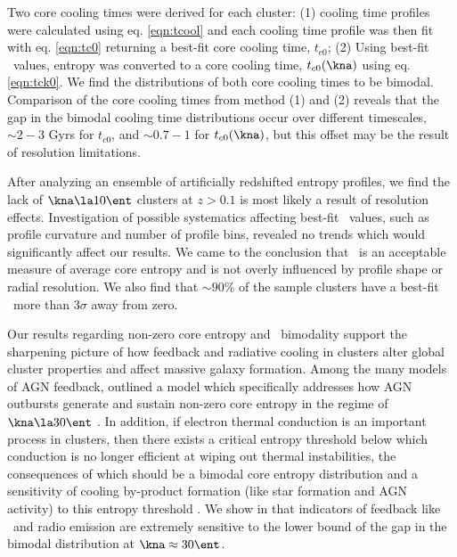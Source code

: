 Two core cooling times were derived for each cluster: (1) cooling time
profiles were calculated using eq. \ref{eqn:tcool} and each cooling
time profile was then fit with eq. \ref{eqn:tc0} returning a best-fit
core cooling time, $t_{c0}$; (2) Using best-fit \kna\ values, entropy
was converted to a core cooling time, $t_{c0}(\kna)$ using
eq. \ref{eqn:tck0}. We find the distributions of both core cooling
times to be bimodal. Comparison of the core cooling times from method
(1) and (2) reveals that the gap in the bimodal cooling time
distributions occur over different timescales, $\sim 2-3$ Gyrs for
$t_{c0}$, and $\sim 0.7-1$ for $t_{c0}(\kna)$, but this offset may be
the result of resolution limitations.

After analyzing an ensemble of artificially redshifted entropy
profiles, we find the lack of $\kna \la 10 \ent$ clusters at $z > 0.1$
is most likely a result of resolution effects. Investigation of
possible systematics affecting best-fit \kna\ values, such as profile
curvature and number of profile bins, revealed no trends which would
significantly affect our results. We came to the conclusion that
\kna\ is an acceptable measure of average core entropy and is not
overly influenced by profile shape or radial resolution. We also find
that $\sim90\%$ of the sample clusters have a best-fit \kna\ more than
$3\sigma$ away from zero.

Our results regarding non-zero core entropy and \kna\ bimodality
support the sharpening picture of how feedback and radiative cooling
in clusters alter global cluster properties and affect massive galaxy
formation. Among the many models of AGN feedback, \citet{agnframework}
outlined a model which specifically addresses how AGN outbursts
generate and sustain non-zero core entropy in the regime of $\kna \la
30 \ent$ \citep[see also][]{kaiser03}. In addition, if electron
thermal conduction is an important process in clusters, then there
exists a critical entropy threshold below which conduction is no
longer efficient at wiping out thermal instabilities, the consequences
of which should be a bimodal core entropy distribution and a
sensitivity of cooling by-product formation (like star formation and
AGN activity) to this entropy threshold \citep{conduction,
  2008ApJ...688..859G}. We show in \citet{haradent} that indicators of
feedback like \halpha\ and radio emission are extremely sensitive to
the lower bound of the gap in the bimodal distribution at $\kna
\approx 30 \ent$.

